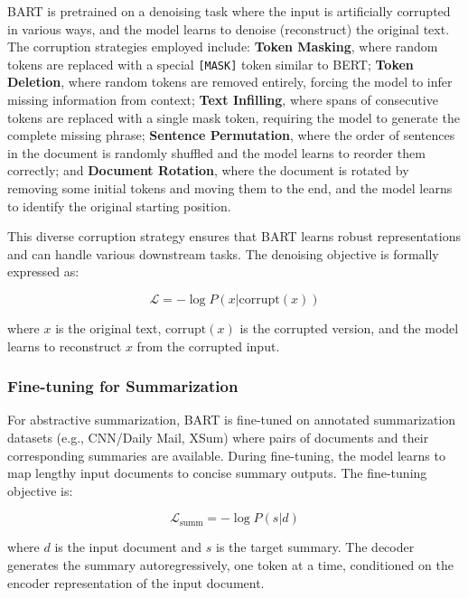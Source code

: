 \gls{BART} is pretrained on a denoising task where the input is artificially corrupted in various ways, and the model learns to denoise (reconstruct) the original text. The corruption strategies employed include: \textbf{Token Masking}, where random tokens are replaced with a special \texttt{[MASK]} token similar to \gls{BERT}; \textbf{Token Deletion}, where random tokens are removed entirely, forcing the model to infer missing information from context; \textbf{Text Infilling}, where spans of consecutive tokens are replaced with a single mask token, requiring the model to generate the complete missing phrase; \textbf{Sentence Permutation}, where the order of sentences in the document is randomly shuffled and the model learns to reorder them correctly; and \textbf{Document Rotation}, where the document is rotated by removing some initial tokens and moving them to the end, and the model learns to identify the original starting position.

This diverse corruption strategy ensures that \gls{BART} learns robust representations and can handle various downstream tasks. The denoising objective is formally expressed as:

\begin{equation}
    \mathcal{L} = -\log P(x | \text{corrupt}(x))
\end{equation}

where $x$ is the original text, $\text{corrupt}(x)$ is the corrupted version, and the model learns to reconstruct $x$ from the corrupted input.

\subsubsection{Fine-tuning for Summarization}

For abstractive summarization, \gls{BART} is fine-tuned on annotated summarization datasets (e.g., CNN/Daily Mail, XSum) where pairs of documents and their corresponding summaries are available. During fine-tuning, the model learns to map lengthy input documents to concise summary outputs. The fine-tuning objective is:

\begin{equation}
    \mathcal{L}_{\text{summ}} = -\log P(s | d)
\end{equation}

where $d$ is the input document and $s$ is the target summary. The decoder generates the summary autoregressively, one token at a time, conditioned on the encoder representation of the input document.

